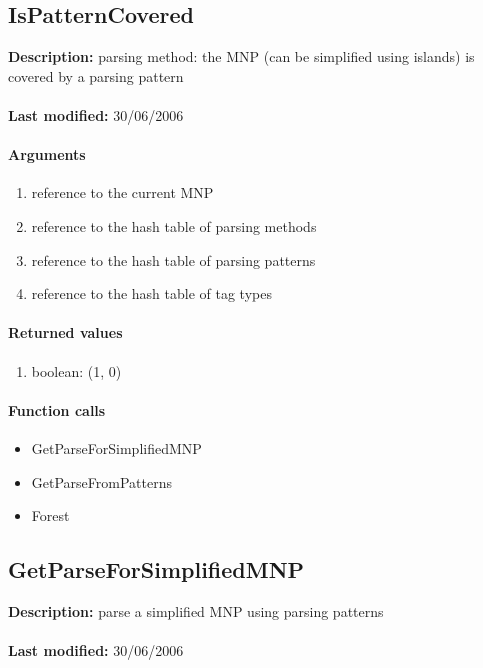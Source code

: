 \subsection{IsPatternCovered}
\textbf{Description:} parsing method: the MNP (can be simplified using islands) is covered by a parsing pattern\\
\\\textbf{Last modified:} 30/06/2006

\paragraph{Arguments}
\begin{enumerate}
\item reference to the current MNP
\item reference to the hash table of parsing methods
\item reference to the hash table of parsing patterns
\item reference to the hash table of tag types
\end{enumerate}

\paragraph{Returned values}
\begin{enumerate}
\item boolean: (1, 0)
\end{enumerate}

\paragraph{Function calls}
\begin{itemize}
\item GetParseForSimplifiedMNP
\item GetParseFromPatterns
\item Forest
\end{itemize}

\subsection{GetParseForSimplifiedMNP}
\textbf{Description:} parse a simplified MNP using parsing patterns\\
\\\textbf{Last modified:} 30/06/2006

